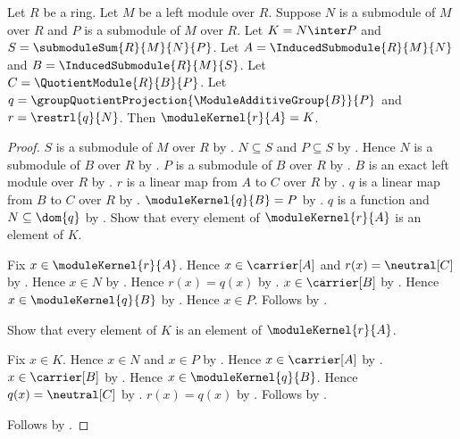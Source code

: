 \begin{theorem}\label{module_second_isomorphism_restriction_kernel}
    Let $R$ be a ring.
    Let $M$ be a left module over $R$.
    Suppose $N$ is a submodule of $M$ over $R$ and
        $P$ is a submodule of $M$ over $R$.
    Let $K=N\inter P$ and $S=\submoduleSum{R}{M}{N}{P}$.
    Let $A=\InducedSubmodule{R}{M}{N}$ and
        $B=\InducedSubmodule{R}{M}{S}$.
    Let $C=\QuotientModule{R}{B}{P}$.
    Let $q=\groupQuotientProjection{\ModuleAdditiveGroup{B}}{P}$ and
        $r=\restrl{q}{N}$.
    Then $\moduleKernel{r}{A}=K$.
\end{theorem}
\begin{proof}
    $S$ is a submodule of $M$ over $R$ by
        .
    $N\subseteq S$ and $P\subseteq S$ by
        .
    Hence $N$ is a submodule of $B$ over $R$ by
        .
    $P$ is a submodule of $B$ over $R$ by
        .
    $B$ is an exact left module over $R$ by
        .
    $r$ is a linear map from $A$ to $C$ over $R$ by
        .
    $q$ is a linear map from $B$ to $C$ over $R$ by
        .
    $\moduleKernel{q}{B}=P$ by
        .
    $q$ is a function and $N\subseteq\dom{q}$ by
        .
    Show that every element of $\moduleKernel{r}{A}$
        is an element of $K$.
    \begin{subproof}
        Fix $x\in\moduleKernel{r}{A}$.
        Hence $x\in\carrier[A]$ and $r(x)=\neutral[C]$ by
            .
        Hence $x\in N$ by .
        Hence $r(x)=q(x)$ by .
        $x\in\carrier[B]$ by
            .
        Hence $x\in\moduleKernel{q}{B}$ by
            .
        Hence $x\in P$.
        Follows by .
    \end{subproof}
    Show that every element of $K$ is an element of
        $\moduleKernel{r}{A}$.
    \begin{subproof}
        Fix $x\in K$.
        Hence $x\in N$ and $x\in P$ by
            .
        Hence $x\in\carrier[A]$ by
            .
        $x\in\carrier[B]$ by
            .
        Hence $x\in\moduleKernel{q}{B}$.
        Hence $q(x)=\neutral[C]$ by .
        $r(x)=q(x)$ by .
        Follows by .
    \end{subproof}
    Follows by .
\end{proof}

